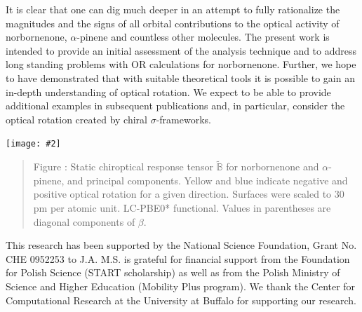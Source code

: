 \documentclass[landscape,a0b,final]{a0poster}
\newcommand{\mat}[1]{\mathbb{#1}} %
\newcommand{\tensortwo}[1]{\mat{#1}}
\newenvironment{poster}{
  \begin{center}
  \begin{minipage}[c]{0.98\textwidth}
}{
  \end{minipage} 
  \end{center}
}
\newcommand{\pbox}[4]{
\psshadowbox[#3]{
\begin{minipage}[t][#2][t]{#1}
#4
\end{minipage}
}}
\newcommand{\myfig}[3][0]{
\begin{center}
  \vspace{1.5cm}
  \texttt{[image: \#2]}
  \nobreak\medskip
\end{center}}
\newcommand{\mycaption}[1]{
  \vspace{0.5cm}
  \begin{quote}
    {{\sc Figure} \arabic{figure}: #1}
  \end{quote}
  \vspace{1cm}
  \stepcounter{figure}
}
\begin{document}
\begin{poster}
\begin{multicols}{3}
    It is clear that one can dig much deeper in an attempt to fully
    rationalize the magnitudes and the signs of all orbital contributions
    to the optical activity of norbornenone, $\alpha$-pinene and countless
    other molecules. The present work is intended to provide an initial
    assessment of the analysis technique and to address long standing
    problems with OR calculations for norbornenone. Further, we
    hope to have demonstrated that with suitable theoretical tools it is
    possible to gain an in-depth understanding of optical rotation. We
    expect to be able to provide additional examples in subsequent
    publications and, in particular, consider the optical rotation created
    by chiral $\sigma$-frameworks.
    \begin{center}
    \myfig[0]{figures/norbornenone-pinene-comparison}{1.0}
    \mycaption{Static chiroptical response tensor $\tilde{\tensortwo{B}}$
        for norbornenone and $\alpha$-pinene, and principal
        components. Yellow and blue indicate negative and positive optical
        rotation for a given direction.  Surfaces were scaled to 30 pm per
        atomic unit. LC-PBE0* functional. Values in parentheses are
        diagonal components of $\tensortwo{\beta}$.}
    \end{center}

\vspace{2cm}\begin{center}\pbox{0.8\columnwidth}{}{linewidth=2mm,framearc=0.1,linecolor=ubblue,fillstyle=gradient,gradangle=0,gradbegin=white,gradend=ubgray,gradmidpoint=1.0,framesep=1em}{\begin{center} \Large \color{ubblue}{\bf{Acknowledgements}}\end{center}}\end{center}\vspace{1.25cm}
    
     This research has been supported by the National Science
     Foundation, Grant No. CHE 0952253 to J.A. M.S. is grateful
     for financial support from the Foundation for Polish Science
     (START scholarship) as well as from the Polish Ministry of
     Science and Higher Education (Mobility Plus program). We
     thank the Center for Computational Research at the University
     at Buffalo for supporting our research.
      



\end{multicols}

\end{poster}
\end{document}
